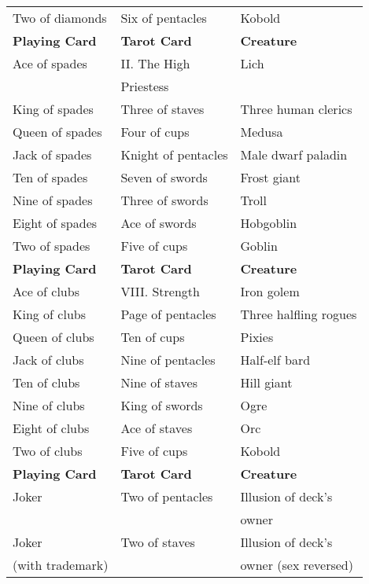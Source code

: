 \begin{tabularx}{\linewidth}{lll}
Two of diamonds        & Six of pentacles       & Kobold                                  \\
\textbf{Playing Card}  & \textbf{Tarot Card}    & \textbf{Creature}                       \\
Ace of spades          & II. The High           & Lich                                    \\
                       & Priestess              &                                         \\
King of spades         & Three of staves        & Three human clerics                     \\
Queen of spades        & Four of cups           & Medusa                                  \\
Jack of spades         & Knight of pentacles    & Male dwarf paladin                      \\
Ten of spades          & Seven of swords        & Frost giant                             \\
Nine of spades         & Three of swords        & Troll                                   \\
Eight of spades        & Ace of swords          & Hobgoblin                               \\
Two of spades          & Five of cups           & Goblin                                  \\
\textbf{Playing Card}  & \textbf{Tarot Card}    & \textbf{Creature}                       \\
Ace of clubs           & VIII. Strength         & Iron golem                              \\
King of clubs          & Page of pentacles      & Three halfling rogues                   \\
Queen of clubs         & Ten of cups            & Pixies                                  \\
Jack of clubs          & Nine of pentacles      & Half-elf bard                           \\
Ten of clubs           & Nine of staves         & Hill giant                              \\
Nine of clubs          & King of swords         & Ogre                                    \\
Eight of clubs         & Ace of staves          & Orc                                     \\
Two of clubs           & Five of cups           & Kobold                                  \\
\textbf{Playing Card}  & \textbf{Tarot Card}    & \textbf{Creature}                       \\
Joker                  & Two of pentacles       & Illusion of deck's \\
                       &                        & owner                \\
Joker                  & Two of staves          & Illusion of deck's \\
 (with trademark)      &                        & owner (sex reversed)
\end{tabularx}				
